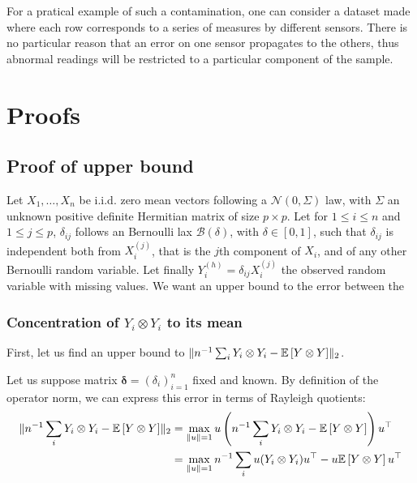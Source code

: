 \documentclass{article}
\numberwithin{equation}{section}
\begin{document}
    For a pratical example of such a contamination, one can consider a dataset made where each row corresponds to a series of measures by different sensors. There is no particular reason that an error on one sensor propagates to the others, thus abnormal readings will be restricted to a particular component of the sample.

    
    
\section{Proofs}

\subsection{Proof of upper bound}

Let $X_1, \dots, X_n$ be i.i.d. zero mean vectors following a 
$\mathcal{N}(0, \Sigma)$ law, with $\Sigma$ an unknown positive definite 
Hermitian matrix of size $p\times p$. Let for $1\leq i\leq n$ and 
$1\leq j\leq p$, $\delta_{ij}$ follows an Bernoulli lax $\mathcal{B}(\delta)$, 
with $\delta\in [0,1]$, such that $\delta_{ij}$ is independent both from 
$X_i^{(j)}$, that is the $j$th component of $X_i$, and of any other Bernoulli 
random variable. Let finally $Y_i^{(h)} = \delta_{ij} X_i^{(j)}$ the observed 
random variable with missing values. We want an upper bound to the error 
between the 

\subsubsection{Concentration of $Y_i\otimes Y_i$ to its mean}

First, let us find an upper bound to $\lVert n^{-1}\sum_i Y_i\otimes Y_i - \mathbb{E}\left[ Y\otimes Y\right] \rVert_2$.

Let us suppose matrix $\bm{\delta} = (\delta_i)_{i=1}^n$ fixed and known. By definition of the operator norm, we can express this error in terms of Rayleigh quotients:
\begin{equation} \label{eqn:rayleigh}
    \begin{split}
    \lVert n^{-1}\sum_i Y_i\otimes Y_i - \mathbb{E}\left[ Y\otimes Y\right] \rVert_2 &= \max_{\lVert u \rVert = 1} u \left( n^{-1}\sum_i Y_i\otimes Y_i - \mathbb{E}\left[ Y\otimes Y\right] \right)u^\top\\
    &= \max_{\lVert u \rVert=1} n^{-1}\sum_i u (Y_i\otimes Y_i)u^\top - u  \mathbb{E}\left[ Y\otimes Y\right] u^\top
    \end{split}
\end{equation}
\end{document}
